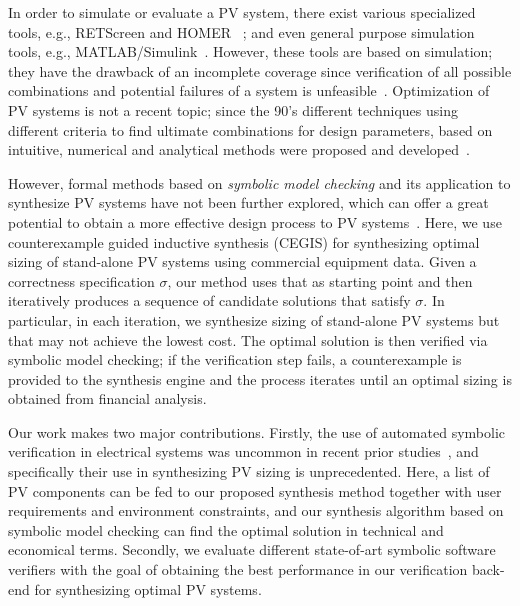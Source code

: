 \documentclass[review]{elsarticle}
\begin{document}
In order to simulate or evaluate a PV system, there exist various specialized tools, e.g., RETScreen and HOMER~\cite{Pradhan,Swarnkar}%
; and even general purpose simulation tools, e.g., MATLAB/Simulink~\cite{Gow1999}. %
 However, these tools are based on simulation; they have the drawback of an incomplete coverage  since verification of all possible combinations and potential failures of a system is unfeasible~\cite{ClarkeHV18}. 
 Optimization of PV systems is not a recent topic; since the 90's different techniques using different criteria to find ultimate combinations for design parameters, based on intuitive, numerical and analytical methods were proposed and developed~\cite{Alsadi2018}.
 
However, formal methods based on \textit{symbolic model checking} and its application to synthesize PV systems have not been further explored, which can offer a great potential to obtain a more effective design process to PV systems~\cite{ClarkeHV18}. Here, we use counterexample guided inductive synthesis (CEGIS) for synthesizing optimal sizing of stand-alone PV systems using commercial equipment data. Given a correctness specification $\sigma$, our method uses that as starting point and then iteratively produces a sequence of candidate solutions that satisfy $\sigma$. In particular, in each iteration, we synthesize sizing of stand-alone PV systems but that may not achieve the lowest cost. The optimal solution is then verified via symbolic model checking; if the verification step fails, a counterexample is provided to the synthesis engine and the process iterates until an optimal sizing is obtained from financial analysis.

Our work makes two major contributions. Firstly, the use of automated symbolic verification in electrical systems was uncommon in recent prior studies~\cite{abs-1811-09438}, and specifically their use in synthesizing PV sizing is unprecedented. Here, a list of PV components %
can be fed to our proposed synthesis method together with user requirements and environment constraints, and our synthesis algorithm based on symbolic model checking can find the optimal solution in technical and economical terms. Secondly, we evaluate different state-of-art symbolic software verifiers with the goal of obtaining the best performance in our verification back-end for synthesizing optimal PV systems.
%
\end{document}
